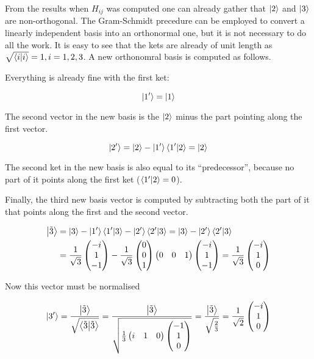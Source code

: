 \documentclass{article}
\newcommand*\colvec[3][]{
    \begin{pmatrix}\ifx\relax#1\relax\else#1\\\fi#2\\#3\end{pmatrix}
}
\begin{document}
From the results when $H_{ij}$ was computed one can already gather that $\ket{2}$ and $\ket{3}$ are non-orthogonal. The Gram-Schmidt precedure can be employed to convert a linearly independent basis into an orthonormal one, but it is not necessary to do all the work. It is easy to see that the kets are already of unit length as $\sqrt{\braket{i}{i}} = 1, i=1,2,3$. A new orthonomral basis is computed as follows.

Everything is already fine with the first ket:

\begin{equation}
\ket{1'}=\ket{1}
\end{equation}

The second vector in the new basis is the $\ket{2}$ minus the part pointing along the first vector. 

\begin{equation}
\ket{2'}=\ket{2}-\ket{1'}\braket{1'}{2}=\ket{2}
\end{equation}

The second ket in the new basis is also equal to its ``predecessor'', because no part of it points along the first ket ($\braket{1'}{2}=0$).

Finally, the third new basis vector is computed by subtracting both the part of it that points along the first and the second vector.

\begin{align}
\ket{\tilde{3}}&=\ket{3}-\ket{1'}\braket{1'}{3}-\ket{2'}\braket{2'}{3}
=\ket{3}-\ket{2'}\braket{2'}{3}\\
&=\frac{1}{\sqrt{3}}\colvec[-i]{1}{-1} - 
\frac{1}{\sqrt{3}}\colvec[0]{0}{1}\begin{pmatrix}0 & 0 & 1\end{pmatrix}\colvec[-i]{1}{-1}=\frac{1}{\sqrt{3}}\colvec[-i]{1}{0}
\end{align}

Now this vector must be normalised

\begin{equation}
\ket{3'}=\frac{\ket{\tilde{3}}}{\sqrt{\braket{\tilde{3}}}}
=\frac{\ket{\tilde{3}}}{\sqrt{\frac{1}{3}\begin{pmatrix}i & 1 & 0\end{pmatrix}\colvec[-1]{1}{0}}}=
\frac{\ket{\tilde{3}}}{\sqrt{\frac{2}{3}}}=\frac{1}{\sqrt{2}}\colvec[-i]{1}{0}
\end{equation}
\end{document}
